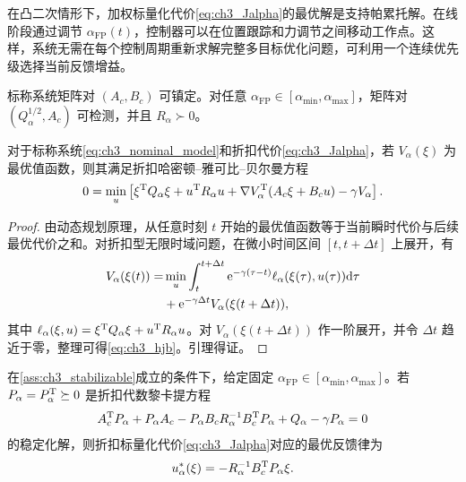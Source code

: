 在凸二次情形下，加权标量化代价\eqref{eq:ch3_Jalpha}的最优解是支持帕累托解。在线阶段通过调节 $\alpha_{\mathrm{FP}}(t)$，控制器可以在位置跟踪和力调节之间移动工作点。这样，系统无需在每个控制周期重新求解完整多目标优化问题，可利用一个连续优先级选择当前反馈增益。

\begin{assumption}[标称系统可镇定与可检测]
\label{ass:ch3_stabilizable}
标称系统矩阵对 $(A_c,B_c)$ 可镇定。对任意 $\alpha_{\mathrm{FP}}\in[\alpha_{\min},\alpha_{\max}]$，矩阵对 $(Q_\alpha^{1/2},A_c)$ 可检测，并且 $R_\alpha\succ0$。
\end{assumption}

\begin{lemma}
\label{lem:ch3_hjb}
对于标称系统\eqref{eq:ch3_nominal_model}和折扣代价\eqref{eq:ch3_Jalpha}，若 $V_\alpha(\xi)$ 为最优值函数，则其满足折扣哈密顿--雅可比--贝尔曼方程
\begin{equation}
  0=\min_u\left[\xi^{\mathrm{T}}Q_\alpha\xi+u^{\mathrm{T}}R_\alpha u+\nabla V_\alpha^{\mathrm{T}}(A_c\xi+B_cu)-\gamma V_\alpha\right].
  \label{eq:ch3_hjb}
\end{equation}
\end{lemma}

\begin{proof}
由动态规划原理，从任意时刻 $t$ 开始的最优值函数等于当前瞬时代价与后续最优代价之和。对折扣型无限时域问题，在微小时间区间 $[t,t+\Delta t]$ 上展开，有
\begin{align}
  V_\alpha(\xi(t))=&\min_u\int_t^{t+\Delta t}\mathrm{e}^{-\gamma(\tau-t)}\ell_\alpha(\xi(\tau),u(\tau))\mathrm{d}\tau \\
  &+\mathrm{e}^{-\gamma\Delta t}V_\alpha(\xi(t+\Delta t)),
\end{align}
其中 $\ell_\alpha(\xi,u)=\xi^{\mathrm{T}}Q_\alpha\xi+u^{\mathrm{T}}R_\alpha u$。对 $V_\alpha(\xi(t+\Delta t))$ 作一阶展开，并令 $\Delta t$ 趋近于零，整理可得\eqref{eq:ch3_hjb}。引理得证。
\end{proof}

\begin{theorem}[固定力位优先级下的折扣帕累托反馈律]
\label{thm:ch3_discount_lqr}
在\cref{ass:ch3_stabilizable}成立的条件下，给定固定 $\alpha_{\mathrm{FP}}\in[\alpha_{\min},\alpha_{\max}]$。若 $P_\alpha=P_\alpha^{\mathrm{T}}\succeq0$ 是折扣代数黎卡提方程
\begin{equation}
  A_c^{\mathrm{T}}P_\alpha+P_\alpha A_c-P_\alpha B_cR_\alpha^{-1}B_c^{\mathrm{T}}P_\alpha+Q_\alpha-\gamma P_\alpha=0
  \label{eq:ch3_discount_are}
\end{equation}
的稳定化解，则折扣标量化代价\eqref{eq:ch3_Jalpha}对应的最优反馈律为
\begin{equation}
  u_\alpha^*(\xi)=-R_\alpha^{-1}B_c^{\mathrm{T}}P_\alpha\xi .
  \label{eq:ch3_u_star}
\end{equation}
\end{theorem}

